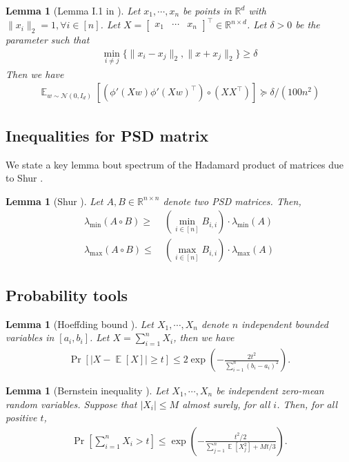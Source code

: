 \documentclass[11pt]{article}
\DeclareMathOperator*{\E}{\mathbb{E}}
\newcommand{\N}{\mathcal{N}}
\newcommand{\R}{\mathbb{R}}
\newtheorem{lemma}[theorem]{Lemma}
\begin{document}
\begin{lemma}[Lemma I.1 in \cite{os20}]
Let $x_1, \cdots, x_n$ be points in $\R^d$ with $\| x_i \|_2 = 1, \forall i \in [n]$. Let $X = \begin{bmatrix} x_1 & \cdots & x_n \end{bmatrix}^\top \in \R^{n \times d}$. Let $\delta > 0 $ be the parameter such that
\begin{align*}
    \min_{i \neq j} \{ \| x_i - x_j \|_2 , \| x + x_j \|_2  \} \geq \delta
\end{align*}
Then we have
\begin{align*}
    \E_{w \sim \N (0,I_d)} [ ( \phi'(X w) \phi'(X w)^\top ) \circ ( X X^\top ) ] \succeq \delta / (100 n^2)
\end{align*}
\end{lemma}

\subsection{Inequalities for PSD matrix}

We state a key lemma bout spectrum of the Hadamard product of matrices due to Shur \cite{s11}.
\begin{lemma}[Shur \cite{s11}]
Let $A, B \in \R^{n \times n}$ denote two PSD matrices. Then,
\begin{align*}
\lambda_{\min} (A \circ B) \geq & ~ ( \min_{i\in [n]} B_{i,i} ) \cdot \lambda_{\min}(A) \\
\lambda_{\max} (A \circ B) \leq & ~ ( \max_{i\in [n]} B_{i,i} ) \cdot \lambda_{\max}(A)
\end{align*}
\end{lemma}

\subsection{Probability tools}


\begin{lemma}[Hoeffding bound \cite{h63}]\label{lem:hoeffding}
Let $X_1, \cdots, X_n$ denote $n$ independent bounded variables in $[a_i,b_i]$. Let $X= \sum_{i=1}^n X_i$, then we have
\begin{align*}
\Pr[ | X - \E[X] | \geq t ] \leq 2\exp \left( - \frac{2t^2}{ \sum_{i=1}^n (b_i - a_i)^2 } \right).
\end{align*}
\end{lemma}

\begin{lemma}[Bernstein inequality \cite{b24}]\label{lem:bernstein}
Let $X_1, \cdots, X_n$ be independent zero-mean random variables. Suppose that $|X_i| \leq M$ almost surely, for all $i$. Then, for all positive $t$,
\begin{align*}
\Pr \left[ \sum_{i=1}^n X_i > t \right] \leq \exp \left( - \frac{ t^2/2 }{ \sum_{j=1}^n \E[X_j^2]  + M t /3 } \right).
\end{align*}
\end{lemma}
\end{document}
